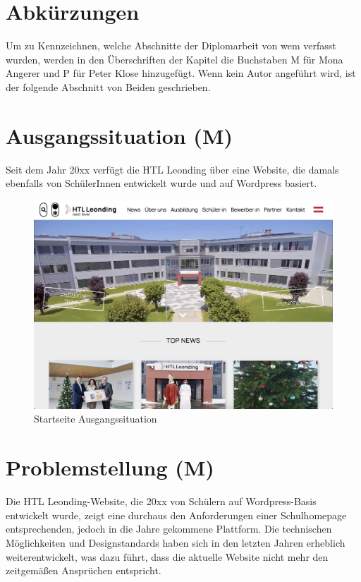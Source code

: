 \section{Abkürzungen}

Um zu Kennzeichnen, welche Abschnitte der Diplomarbeit von wem verfasst wurden,
werden in den Überschriften der Kapitel die Buchstaben M für Mona Angerer und P für Peter Klose
hinzugefügt. Wenn kein Autor angeführt wird, ist der folgende Abschnitt von 
Beiden geschrieben.


\section{Ausgangssituation (M)}

Seit dem Jahr 20xx verfügt die HTL Leonding über eine Website, 
die damals ebenfalls von SchülerInnen entwickelt wurde und auf Wordpress basiert. 

\begin{figure}
    \centering
    \includegraphics[scale=0.3]{pics/startseite_ausgangslage.png}
    \caption{Startseite Ausgangssituation}
    \label{fig:impl:startseite_ausgangslage}
\end{figure}


\section{Problemstellung (M)}

Die HTL Leonding-Website, die 20xx von Schülern auf Wordpress-Basis entwickelt wurde, 
zeigt eine durchaus den Anforderungen einer Schulhomepage entsprechenden, 
jedoch in die Jahre gekommene Plattform. Die technischen Möglichkeiten und Designstandards haben 
sich in den letzten Jahren erheblich weiterentwickelt, was dazu führt, dass die aktuelle 
Website nicht mehr den zeitgemäßen Ansprüchen entspricht. 

